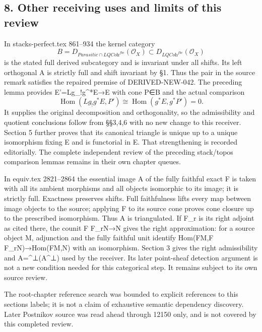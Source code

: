 \subsection{8. Other receiving uses and limits of this review}\label{proofs-11665-12003-other-receiving-uses-and-limits-of-this-review}

In stacks-perfect.tex 861–\allowbreak{}934 the kernel category \[
 B=D_{\textit{Parasitic}\cap\textit{LQCoh}^{fbc}}(\mathcal O_X)
 \subset D_{\textit{LQCoh}^{fbc}}(\mathcal O_X)
\] is the stated full derived subcategory and is invariant under all shifts. Its left orthogonal A is strictly full and shift invariant by §1. Thus the pair in the source remark satisfies the repaired premise of DERIVED-NEW-042. The preceding lemma provides E'\allowbreak{}=Lg\_\allowbreak{}!g\textasciicircum{}*E\allowbreak{}→E with cone P\allowbreak{}∈B and the actual comparison \[
 \operatorname{Hom}(Lg_!g^*E,P')
  \cong\operatorname{Hom}(g^*E,g^*P')=0.
\] It supplies the original decomposition and orthogonality,\allowbreak{} so the admissibility and quotient conclusions follow from §§3,\allowbreak{}4,\allowbreak{}6 with no new change to this receiver. Section 5 further proves that its canonical triangle is unique up to a unique isomorphism fixing E and is functorial in E. That strengthening is recorded editorially. The complete independent review of the preceding stack/\allowbreak{}topos comparison lemmas remains in their own chapter queues.

In equiv.tex 2821–\allowbreak{}2864 the essential image A of the fully faithful exact F is taken with all its ambient morphisms and all objects isomorphic to its image; it is strictly full. Exactness preserves shifts. Full faithfulness lifts every map between image objects to the source; applying F to its source cone proves cone closure up to the prescribed isomorphism. Thus A is triangulated. If F\_\allowbreak{}r is its right adjoint as cited there,\allowbreak{} the counit F F\_\allowbreak{}rN\allowbreak{}→N gives the right approximation:\allowbreak{} for a source object M,\allowbreak{} adjunction and the fully faithful unit identify Hom(FM,\allowbreak{}F F\_\allowbreak{}rN)\allowbreak{}\allowbreak{}→Hom(FM,\allowbreak{}N)\allowbreak{} with an isomorphism. Section 3 gives the right admissibility and A\allowbreak{}=\textasciicircum{}⊥(A\textasciicircum{}⊥)\allowbreak{} used by the receiver. Its later point-sheaf detection argument is not a new condition needed for this categorical step. It remains subject to its own source review.

The root-chapter reference search was bounded to explicit references to this section\textquotesingle s labels; it is not a claim of exhaustive semantic dependency discovery. Later Postnikov source was read ahead through 12150 only,\allowbreak{} and is not covered by this completed review.
